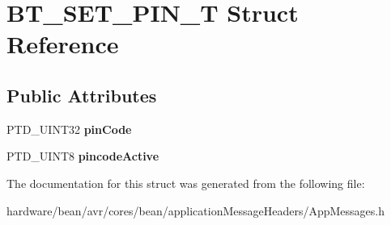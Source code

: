 \hypertarget{struct_b_t___s_e_t___p_i_n___t}{}\section{B\+T\+\_\+\+S\+E\+T\+\_\+\+P\+I\+N\+\_\+T Struct Reference}
\label{struct_b_t___s_e_t___p_i_n___t}
\subsection*{Public Attributes}
\begin{DoxyCompactItemize}
\item 
P\+T\+D\+\_\+\+U\+I\+N\+T32 {\bfseries pin\+Code}\hypertarget{struct_b_t___s_e_t___p_i_n___t_a94c77f9d979a537a554c81551b45c24c}{}\label{struct_b_t___s_e_t___p_i_n___t_a94c77f9d979a537a554c81551b45c24c}

\item 
P\+T\+D\+\_\+\+U\+I\+N\+T8 {\bfseries pincode\+Active}\hypertarget{struct_b_t___s_e_t___p_i_n___t_a857fc35778ecf9700cb5d1ea97e4a2f5}{}\label{struct_b_t___s_e_t___p_i_n___t_a857fc35778ecf9700cb5d1ea97e4a2f5}

\end{DoxyCompactItemize}


The documentation for this struct was generated from the following file\+:\begin{DoxyCompactItemize}
\item 
hardware/bean/avr/cores/bean/application\+Message\+Headers/App\+Messages.\+h\end{DoxyCompactItemize}
